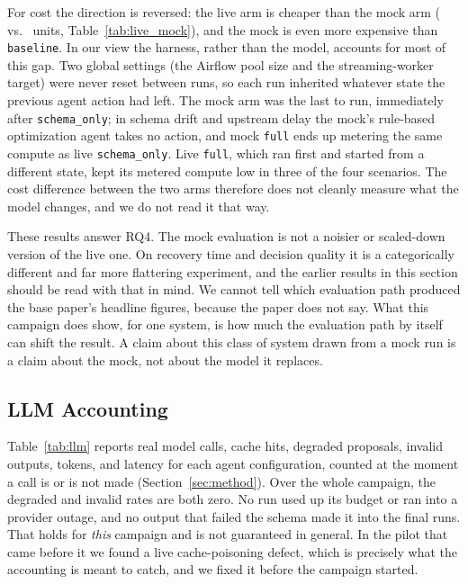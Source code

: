 For cost the direction is reversed: the live arm is cheaper than the mock arm
(\NLiveVsMockCostUnitsLive{} vs.\ \NLiveVsMockCostUnitsMock{} units, Table~\ref{tab:live_mock}), and
the mock is even more expensive than \texttt{baseline}. In our view the harness, rather than the
model, accounts for most of this gap. Two global settings (the Airflow pool size and the
streaming-worker target) were never reset between runs, so each run inherited whatever state the
previous agent action had left. The mock arm was the last to run, immediately after
\texttt{schema\_only}; in schema drift and upstream delay the mock's rule-based optimization agent
takes no action, and mock \texttt{full} ends up metering the same compute as live
\texttt{schema\_only}. Live \texttt{full}, which ran first and started from a different state, kept
its metered compute low in three of the four scenarios. The cost difference between the two arms therefore does not cleanly measure
what the model changes, and we do not read it that way.

These results answer RQ4. The mock evaluation is not a noisier or scaled-down version of the live
one. On recovery time and decision quality it is a categorically different and far more flattering
experiment, and the earlier results in this section should be read with that in mind. We cannot tell
which evaluation path produced the base paper's headline figures, because the paper does not say.
What this campaign does show, for one system, is how much the evaluation path by itself can shift the
result. A claim
about this class of system drawn from a mock run is a claim about the mock, not about the model it
replaces.

\subsection{LLM Accounting}

\begin{table}[t]
\centering
\caption{Median Per-Run LLM Usage of Each Agent Configuration (Calls, Cache Hits, Degraded and Invalid Proposals, Tokens, Latency)}
\label{tab:llm}
\small

\end{table}

Table~\ref{tab:llm} reports real model calls, cache hits, degraded proposals, invalid outputs,
tokens, and latency for each agent configuration, counted at the moment a call is or is not made
(Section~\ref{sec:method}). Over the whole campaign, the degraded and invalid rates are both zero. No
run used up its budget or ran into a provider outage, and no output that failed the schema made it
into the final runs. That holds for \emph{this} campaign and is not guaranteed in general. In the
pilot that came before it we found a live cache-poisoning defect, which is precisely what the
accounting is meant to catch, and we fixed it before the campaign started.

